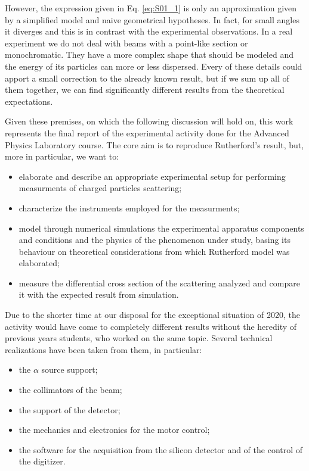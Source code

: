 \documentclass[../../main/main.tex]{subfiles}
\begin{document}
However, the expression given in Eq. \ref{eq:S01_1} is only an approximation given by a simplified model and naive geometrical hypotheses. In fact, for small angles it diverges and this is in contrast with the experimental observations.
In a real experiment we do not deal with beams with a point-like section or monochromatic. They have a more complex shape that should be modeled and the energy of its particles can more or less dispersed. Every of these details could apport a small correction to the already known result, but if we sum up all of them together, we can find significantly different results from the theoretical expectations.

Given these premises, on which the following discussion will hold on, this work represents the final report of the experimental activity done for the Advanced Physics Laboratory course. The core aim is to reproduce Rutherford's result, but, more in particular, we want to:
\begin{itemize}
    \item elaborate and describe an appropriate experimental setup for performing measurments of charged particles scattering;
    \item characterize the instruments employed for the measurments;
    \item model through numerical simulations the experimental apparatus components and conditions and the physics of the phenomenon under study, basing its behaviour on theoretical considerations from which Rutherford model was elaborated;
    \item measure the differential cross section of the scattering analyzed and compare it with the expected result from simulation.
\end{itemize}
Due to the shorter time at our disposal for the exceptional situation of 2020, the activity would have come to completely different results without the heredity of previous years students, who worked on the same topic. Several technical realizations have been taken from them, in particular:
\begin{itemize}
    \item the \( \alpha \) source support;
    \item the collimators of the beam;
    \item the support of the detector;
    \item the mechanics and electronics for the motor control;
    \item the software for the acquisition from the silicon detector and of the control of the digitizer.
\end{itemize}
\end{document}
